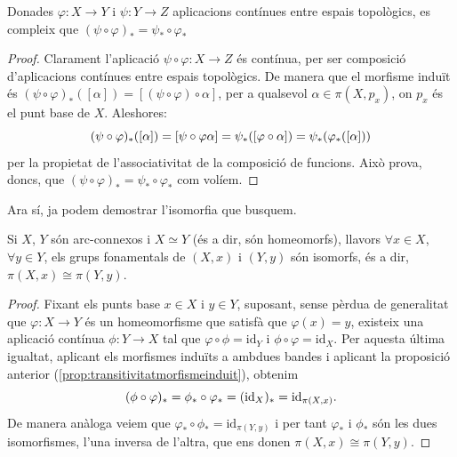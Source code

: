 \documentclass[../main.tex]{subfiles}
\begin{document}
\begin{prop}
\label{prop:transitivitatmorfismeinduit} Donades $\varphi:X\rightarrow Y$ i $\psi:Y\rightarrow Z$ aplicacions contínues entre espais topològics, es compleix que $(\psi\circ\varphi)_* = \psi_*\circ\varphi_*$
\end{prop}
\begin{proof}
Clarament l'aplicació $\psi\circ\varphi:X\rightarrow Z$ és contínua, per ser composició d'aplicacions contínues entre espais topològics. De manera que el morfisme induït és $(\psi\circ\varphi)_*([\alpha])=[(\psi\circ\varphi)\circ\alpha]$, per a qualsevol $\alpha\in\pi(X,p_x)$, on $p_x$ és el punt base de $X$. Aleshores:
\begin{equation}
    \notag
    (\psi\circ\varphi)_*([\alpha]) = [\psi\circ\varphi\alpha] = \psi_*([\varphi\circ\alpha]) = \psi_*(\varphi_*([\alpha]))
\end{equation}
per la propietat de l'associativitat de la composició de funcions. Això prova, doncs, que $(\psi\circ\varphi)_*=\psi_*\circ\varphi_*$ com volíem.
\end{proof}

Ara sí, ja podem demostrar l'isomorfia que busquem.

\begin{ter}
\label{ter:invarianciatopologicadelgrupfonamental} Si $X$, $Y$ són arc-connexos i $X\simeq Y$ (és a dir, són homeomorfs), llavors $\forall x\in X$, $\forall y\in Y$, els grups fonamentals de $(X,x)$ i $(Y,y)$ són isomorfs, és a dir, $\pi(X,x)\cong \pi(Y,y)$.
\end{ter}
\begin{proof}
Fixant els punts base $x\in X$ i $y\in Y$, suposant, sense pèrdua de generalitat que $\varphi:X\rightarrow Y$ és un homeomorfisme que satisfà que $\varphi(x) = y$, existeix una aplicació contínua $\phi:Y\rightarrow X$ tal que $\varphi\circ\phi = \mathrm{id}_Y$ i $\phi\circ\varphi=\mathrm{id}_X$. Per aquesta última igualtat, aplicant els morfismes induïts a ambdues bandes i aplicant la proposició anterior (\ref{prop:transitivitatmorfismeinduit}), obtenim 
\begin{equation}
    \notag
    (\phi\circ\varphi)_*=\phi_*\circ\varphi_*=(\mathrm{id}_X)_*= \mathrm{id}_{\pi(X,x)}.
\end{equation}
De manera anàloga veiem que $\varphi_*\circ\phi_*=\mathrm{id}_{\pi(Y,y)}$ i per tant $\varphi_*$ i $\phi_*$ són les dues isomorfismes, l'una inversa de l'altra, que ens donen $\pi(X,x)\cong \pi(Y,y)$.
\end{proof}
\end{document}
